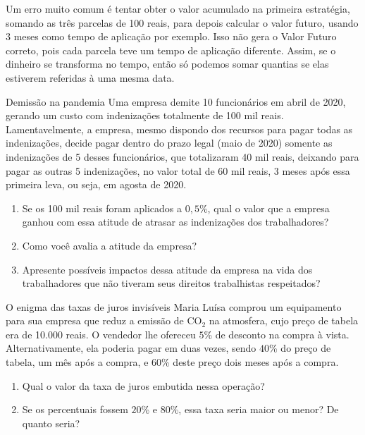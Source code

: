 Um erro muito comum é tentar obter o valor acumulado na primeira estratégia, somando as três parcelas de 100 reais, para depois calcular o valor futuro, usando 3 meses como tempo de aplicação por exemplo. Isso não gera o Valor Futuro correto, pois cada parcela teve um tempo de aplicação diferente. Assim, se o dinheiro se transforma no tempo, então só podemos somar quantias se elas estiverem referidas à uma mesma data.


\begin{task}{Demissão na pandemia}
Uma empresa demite 10 funcionários em abril de 2020, gerando um custo com indenizações totalmente de 100 mil reais. Lamentavelmente, a empresa, mesmo dispondo dos recursos para pagar todas as indenizações, decide pagar dentro do prazo legal (maio de 2020) somente as indenizações de 5 desses funcionários, que totalizaram 40 mil reais, deixando para pagar as outras 5 indenizações, no valor total de 60 mil reais, 3 meses após essa primeira leva, ou seja, em agosta de 2020.
\begin{enumerate}
  \item Se os 100 mil reais foram aplicados a $0{,}5$\%, qual o valor que a empresa ganhou com essa atitude de atrasar as indenizações dos trabalhadores?
  \item Como você avalia a atitude da empresa?
  \item Apresente possíveis impactos dessa atitude da empresa na vida dos trabalhadores que não tiveram seus direitos trabalhistas respeitados?
\end{enumerate}
\end{task}


\begin{task}{O enigma das taxas de juros invisíveis}
Maria Luísa comprou um equipamento para sua empresa que reduz a emissão de CO$_2$ na atmosfera, cujo preço de tabela era de 10.000 reais. O vendedor lhe ofereceu $5$\% de desconto na compra à vista. Alternativamente, ela poderia pagar em duas vezes, sendo $40$\% do preço de tabela, um mês após a compra, e $60$\% deste preço dois meses após a compra.
\begin{enumerate}
  \item Qual o valor da taxa de juros embutida nessa operação?
  \item Se os percentuais fossem $20$\% e $80$\%, essa taxa seria maior ou menor? De quanto seria?
\end{enumerate}
\end{task}

